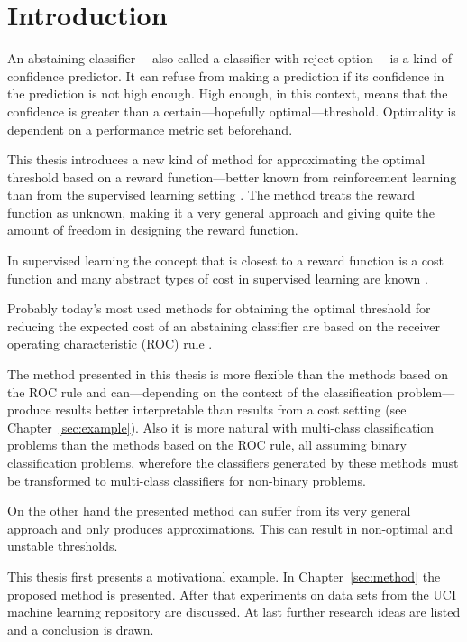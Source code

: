 \documentclass[twoside,11pt]{article}
\begin{document}
\section{Introduction}
\label{sec:intro}

An abstaining classifier
\citep[see e.g.][]{vanderlooy_et_al_2009}---also called a
classifier with reject option
\citep[see e.g.][]{fisher_et_al_2016}---is a kind
of confidence predictor.
It can refuse from making a prediction if its confidence in
the prediction is not high enough.
High enough, in this context, means that the confidence is
greater than a certain---hopefully optimal---threshold.
Optimality is dependent on a performance metric set
beforehand.

This thesis introduces a new kind of method for
approximating the optimal threshold based on a reward
function---better known from reinforcement learning than
from the supervised learning setting
\citep[see e.g.][Chapter 1]{sutton_et_al_2018}.
The method treats the reward function as unknown, making it
a very general approach and giving quite the amount of
freedom in designing the reward function.

In supervised learning the concept that is closest to a
reward function is a cost function and many abstract types
of cost in supervised learning are known
\citep[see][]{turney_2000}.

Probably today's most used methods for obtaining the
optimal threshold for reducing the expected cost of an
abstaining classifier are based on the receiver operating
characteristic (ROC) rule
\citep[see][]{tortella_2000,pietraszek_2005,
  vanderlooy_et_al_2009, guan_et_al_2018}.

The method presented in this thesis is more flexible than
the methods based on the ROC rule and can---depending on
the context of the classification problem---produce results
better interpretable than results from a cost setting
(see Chapter~\ref{sec:example}).
Also it is more natural with multi-class classification
problems than the methods based on the ROC rule, all
assuming binary classification problems, wherefore the
classifiers generated by these methods must be transformed
to multi-class classifiers for non-binary problems.

On the other hand the presented method can suffer from its
very general approach and only produces approximations.
This can result in non-optimal and unstable thresholds.

This thesis first presents a motivational example.
In Chapter~\ref{sec:method} the proposed method is
presented.
After that experiments on data sets from the UCI machine
learning repository \citep[see][]{uci} are discussed.
At last further research ideas are listed and a conclusion
is drawn.
\end{document}

